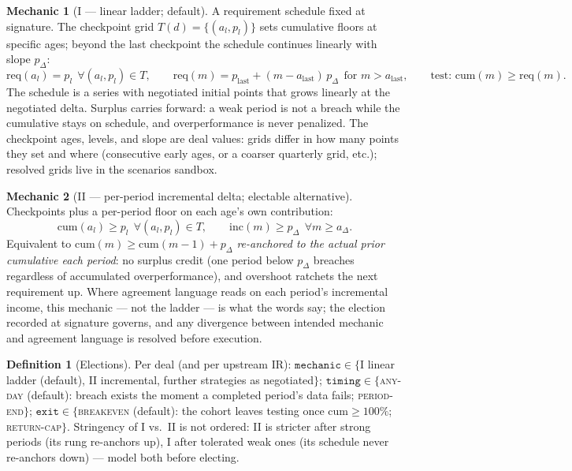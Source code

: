 \documentclass[11pt, a4paper]{article}
\theoremstyle{definition}
\newtheorem{definition}{Definition}[section]
\newtheorem{mechanic}{Mechanic}
\newcommand{\src}[1]{}
\newcommand{\GCCIA}{upstream facility}
\newcommand{\KCIA}{downstream agreement}
\newcommand{\cum}{\mathrm{cum}}
\newcommand{\inc}{\mathrm{inc}}
\newcommand{\param}[1]{\texttt{#1}}
\begin{document}
\begin{mechanic}[I --- linear ladder; default]\label{mech:one}
A requirement schedule fixed at signature. The checkpoint grid $T(d) = \{(a_l, p_l)\}$ sets cumulative floors at specific ages; beyond the last checkpoint the schedule continues linearly with slope $p_{\Delta}$:
\[
\mathrm{req}(a_l) = p_l \ \ \forall (a_l, p_l) \in T,
\qquad
\mathrm{req}(m) = p_{\mathrm{last}} + (m - a_{\mathrm{last}})\, p_{\Delta} \ \ \text{for } m > a_{\mathrm{last}},
\qquad \text{test: } \cum(m) \geq \mathrm{req}(m).
\]
The schedule is a series with negotiated initial points that grows linearly at the negotiated delta. Surplus carries forward: a weak period is not a breach while the cumulative stays on schedule, and overperformance is never penalized. The checkpoint ages, levels, and slope are deal values: grids differ in how many points they set and where (consecutive early ages, or a coarser quarterly grid, etc.); resolved grids live in the scenarios sandbox.
\end{mechanic}

\begin{mechanic}[II --- per-period incremental delta; electable alternative]\label{mech:two}
Checkpoints plus a per-period floor on each age's own contribution:
\[
\cum(a_l) \geq p_l \ \ \forall (a_l, p_l) \in T, \qquad \inc(m) \geq p_{\Delta} \ \ \forall m \geq a_{\Delta}.
\]
Equivalent to $\cum(m) \geq \cum(m{-}1) + p_{\Delta}$ \emph{re-anchored to the actual prior cumulative each period}: no surplus credit (one period below $p_{\Delta}$ breaches regardless of accumulated overperformance), and overshoot ratchets the next requirement up. Where agreement language reads on each period's incremental income, this mechanic --- not the ladder --- is what the words say; the election recorded at signature governs, and any divergence between intended mechanic and agreement language is resolved before execution.
\end{mechanic}

\begin{definition}[Elections]\label{def:elections}
Per deal (and per upstream IR): $\param{mechanic} \in \{$I linear ladder (default), II incremental, further strategies as negotiated$\}$; $\param{timing} \in \{$\textsc{any-day} (default): breach exists the moment a completed period's data fails; \textsc{period-end}$\}$; $\param{exit} \in \{$\textsc{breakeven} (default): the cohort leaves testing once $\cum \geq 100\%$; \textsc{return-cap}$\}$. Stringency of I vs.\ II is not ordered: II is stricter after strong periods (its rung re-anchors up), I after tolerated weak ones (its schedule never re-anchors down) --- model both before electing.
\src{\GCCIA{} \S1.1 (``Cohort Threshold Breach'': ``on any day''); \KCIA{} \S1.1 (same); both Sch.~A (``Tested Cohort'' exit proviso).}
\end{definition}
\end{document}
